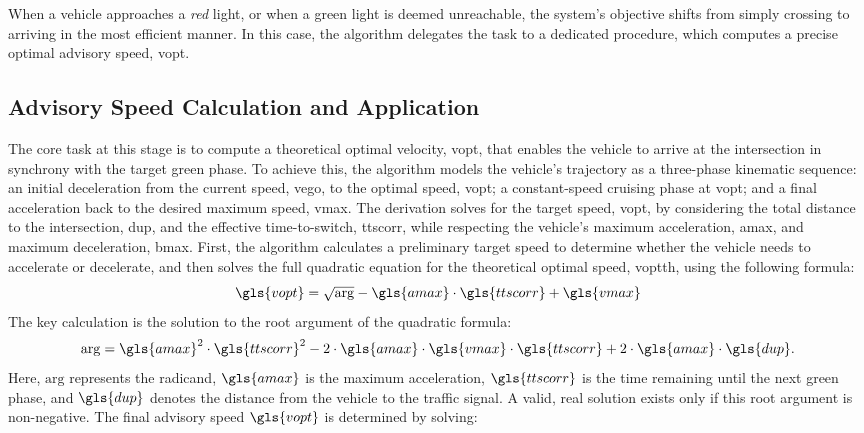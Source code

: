 When a vehicle approaches a \textit{red} light, or when a green light is deemed unreachable, the system's objective shifts from simply crossing to arriving in the most efficient manner. In this case, the algorithm delegates the task to a dedicated procedure, which computes a precise optimal advisory speed, \gls{vopt}.

\subsection{Advisory Speed Calculation and Application}
\label{sec:Glosa_Speed_Adaptation}

The core task at this stage is to compute a theoretical optimal velocity, \gls{vopt}, that enables the vehicle to arrive at the intersection in synchrony with the target green phase. To achieve this, the algorithm models the vehicle's trajectory as a three-phase kinematic sequence: an initial deceleration from the current speed, \gls{vego}, to the optimal speed, \gls{vopt}; a constant-speed cruising phase at \gls{vopt}; and a final acceleration back to the desired maximum speed, \gls{vmax}.
\mynewline
The derivation solves for the target speed, \gls{vopt}, by considering the total distance to the intersection, \gls{dup}, and the effective time-to-switch, \gls{ttscorr}, while respecting the vehicle's maximum acceleration, \gls{amax}, and maximum deceleration, \gls{bmax}. First, the algorithm calculates a preliminary target speed to determine whether the vehicle needs to accelerate or decelerate, and then solves the full quadratic equation for the theoretical optimal speed, \gls{voptth}, using the following formula:
\begin{equation}
    \gls{vopt} = \sqrt{\mathrm{arg}} - \gls{amax} \cdot \gls{ttscorr} + \gls{vmax}
\end{equation}
The key calculation is the solution to the root argument of the quadratic formula:
\begin{equation}
    \mathrm{arg} = \gls{amax}^2 \cdot \gls{ttscorr}^2 - 2 \cdot \gls{amax} \cdot \gls{vmax} \cdot \gls{ttscorr} + 2 \cdot \gls{amax} \cdot \gls{dup}.
\end{equation}
Here, $\mathrm{arg}$ represents the radicand, $\gls{amax}$ is the maximum acceleration, $\gls{ttscorr}$ is the time remaining until the next green phase, and $\gls{dup}$ denotes the distance from the vehicle to the traffic signal. A valid, real solution exists only if this root argument is non-negative.
\mynewline
The final advisory speed $\gls{vopt}$ is determined by solving:
